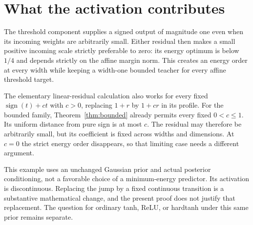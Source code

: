 \documentclass[11pt]{article}
\newcommand{\sgn}{\operatorname{sign}}
\begin{document}
\section{What the activation contributes}

The threshold component supplies a signed output of magnitude one even
when its incoming weights are arbitrarily small. Either residual
then makes a small positive incoming scale strictly preferable to zero:
its energy optimum is below $1/4$ and depends strictly on the affine
margin norm. This creates an energy order at every width while keeping
a width-one bounded teacher for every affine threshold target.

The elementary linear-residual calculation also works for every fixed
$\sgn(t)+ct$ with $c>0$, replacing $1+r$ by $1+cr$ in its profile.
For the bounded family, Theorem~\ref{thm:bounded} already permits every
fixed $0<c\le1$. Its uniform distance from pure sign is at most $c$.
The residual may therefore be arbitrarily small, but its coefficient is
fixed across widths and dimensions. At $c=0$ the strict energy order
disappears, so that limiting case needs a different argument.

This example uses an unchanged Gaussian prior and actual posterior
conditioning, not a favorable choice of a minimum-energy predictor.
Its activation is discontinuous. Replacing the jump by a fixed continuous
transition is a substantive mathematical change, and the present proof
does not justify that replacement. The question for ordinary tanh,
ReLU, or hardtanh under this same prior remains separate.
\end{document}
